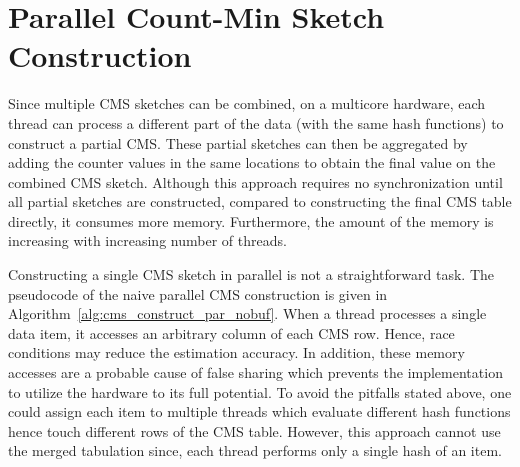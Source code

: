 \documentclass[10pt, conference, compsocconf]{IEEEtran}
\begin{document}
\section{Parallel Count-Min Sketch Construction}\label{sec:par}

Since multiple CMS sketches can be combined, on a multicore hardware,  each thread can process a different part of the data (with the same hash functions) to construct a partial CMS. These partial sketches can then be aggregated by adding the counter values in the same locations  to obtain the final value on the combined CMS sketch. Although this approach requires no synchronization until all partial sketches are constructed, compared to constructing the final CMS table directly, it consumes more memory. Furthermore, the amount of the memory is increasing with increasing number of threads. 

Constructing a single CMS sketch in parallel is not a straightforward task. The pseudocode of the naive parallel CMS construction is given in Algorithm~\ref{alg:cms_construct_par_nobuf}. When a thread processes a single data item, it accesses an arbitrary column of each CMS row. Hence, race conditions may reduce the estimation accuracy. In addition, these memory accesses are a probable cause of false sharing which prevents the implementation to utilize the hardware to its full potential. To avoid the pitfalls stated above, one could assign each item to multiple threads which evaluate different hash functions hence touch different rows of the CMS table. However, this approach cannot use the merged tabulation since, each thread performs only a single hash of an item. 
\end{document}
